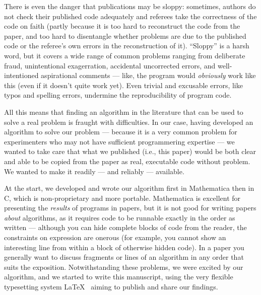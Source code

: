 \documentclass[preprint,times]{elsarticle}
\begin{document}
There is even the danger that publications may be sloppy: sometimes, authors do not check their published code adequately and referees take the correctness of the code on faith (partly because it is too hard to reconstruct the code from the paper, and too hard to disentangle whether problems are due to the published code or the referee's own errors in the reconstruction of it). ``Sloppy'' is a harsh word, but it covers a wide range of common problems ranging from deliberate fraud, unintentional exagerration, accidental uncorrected errors, and well-intentioned aspirational comments --- like, the program would \emph{obviously\/} work like this (even if it doesn't quite work yet). Even trivial and excusable errors, like typos and spelling errors, undermine the reproducibility of program code.

All this means that finding an algorithm in the literature that can be used to solve a real problem is fraught with difficulties. In our case, having developed an algorithm to solve our problem --- because it is a very common problem for experimenters who may not have sufficient programmering expertise --- we wanted to take care that what we published (i.e., this paper) would be both clear and able to be copied from the paper as real, executable code without problem. We wanted to make it readily --- and reliably --- available.

At the start, we developed and wrote our algorithm first in Mathematica then in C, which is non-proprietary and more portable. Mathematica is excellent for presenting the \emph{results\/} of programs in papers, but it is not good for writing papers \emph{about\/} algorithms, as it requires code to be runnable exactly in the order as written --- although you can hide complete blocks of code from the reader, the constraints on expression are onerous (for example, you cannot show an interesting line from within a block of otherwise hidden code). In a paper you generally want to discuss fragments or lines of an algorithm in any order that suits the exposition. Notwithstanding these problems, we were excited by our algorithm, and we started to write this manuscript, using the very flexible typesetting system \LaTeX\ \cite{latex} aiming to publish and share our findings.
\end{document}
